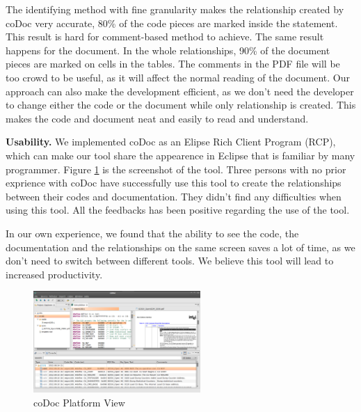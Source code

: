 \documentclass[conference]{IEEEtran}
\begin{document}
The identifying method with fine granularity makes the relationship created by coDoc very accurate, 
80\% of the code pieces are marked inside the statement.
This result is hard for comment-based method to achieve.
The same result happens for the document.
In the whole relationships, 
90\% of the document pieces are marked on cells in the tables.
The comments in the PDF file will be too crowd to be useful,
as it will affect the normal reading of the document.
Our approach can also make the development efficient,
as we don't need the developer to change either the code or the document while only relationship is created.
This makes the code and document neat and easily to read and understand.

\noindent \textbf{Usability.} We implemented coDoc as an Elipse Rich Client Program (RCP), 
which can make our tool share the appearence in Eclipse that is familiar by many programmer.
Figure \ref{fig:platformview} is the screenshot of the tool.
Three persons with no prior exprience with coDoc have successfully use this tool to create the relationships between their codes and documentation.
They didn't find any difficulties when using this tool.
All the feedbacks has been positive regarding the use of the tool.

In our own experience, we found that the ability to see the code, 
the documentation and the relationships on the same screen saves a lot of time,
as we don't need to switch between different tools.
We believe this tool will lead to increased productivity.

\begin{figure}
\centering
\includegraphics[width=2.5in]{platformview}
\caption{coDoc Platform View}
\label{fig:platformview}
\end{figure}
\end{document}
